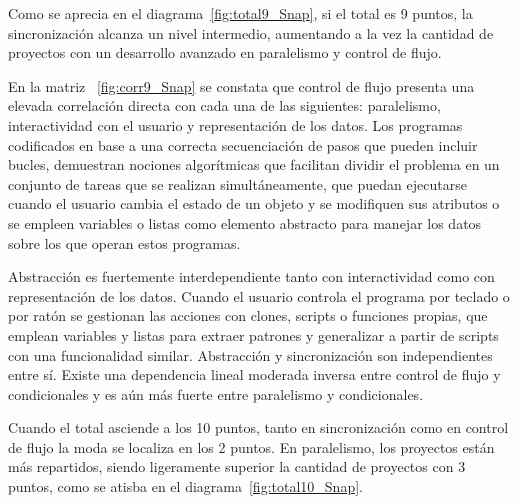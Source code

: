 \documentclass[a4paper, 12pt]{book}
\begin{document}
Como se aprecia en el diagrama~\ref{fig:total9_Snap}, si el total es 9 puntos, la sincronización alcanza un nivel intermedio, aumentando a la vez la cantidad de proyectos con un desarrollo avanzado en paralelismo y control de flujo. 

En la matriz ~\ref{fig:corr9_Snap} se constata que control de flujo presenta una elevada correlación directa con cada una de las siguientes: paralelismo, interactividad con el usuario y representación de los datos. 
Los programas codificados en base a una correcta secuenciación de pasos que pueden incluir bucles, demuestran nociones algorítmicas que facilitan dividir el problema en un conjunto de tareas que se realizan simultáneamente, que puedan ejecutarse cuando el usuario cambia el estado de un objeto y se modifiquen sus atributos o se empleen variables o listas como elemento abstracto para manejar los datos sobre los que operan estos programas. 

Abstracción es fuertemente interdependiente tanto con interactividad como con representación de los datos. Cuando el usuario controla el programa por teclado o por ratón se gestionan las acciones con clones, scripts o funciones propias, que emplean variables y listas para extraer patrones y generalizar a partir de scripts con una funcionalidad similar. Abstracción y sincronización son independientes entre sí. Existe una dependencia lineal moderada inversa entre control de flujo y condicionales y es aún más fuerte entre paralelismo y condicionales. 

Cuando el total asciende a los 10 puntos, tanto en sincronización como en control de flujo la moda se localiza en los 2 puntos. En paralelismo, los proyectos están más repartidos, siendo ligeramente superior la cantidad de proyectos con 3 puntos, como se atisba en el diagrama~\ref{fig:total10_Snap}.
\end{document}
